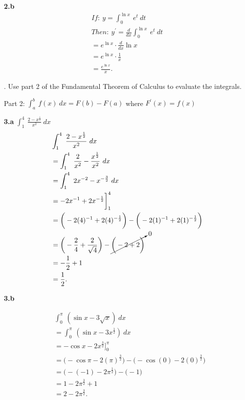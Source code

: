 \documentclass{report}
\begin{document}
    \bigbreak \noindent 
    \textbf{2.b}
    \begin{align*}
        If:\ y = \int_{0}^{\ln{x}}\ e^{t}\ dt \\
        Then:\ y^{\prime} = \frac{d}{dx} \int_{0}^{\ln{x}}\ e^{t}\ dt \\
        = e^{\ln{x}} \cdot \frac{d}{dx}\ln{x} \\
        = e^{\ln{x}} \cdot \frac{1}{x} \\
        = \frac{e^{\ln{x}}}{x}
    .\end{align*}

    \pagebreak \bigbreak {}. Use part 2 of the Fundamental Theorem of Calculus to evaluate the integrals.

    \bigbreak \noindent 
    \begin{remark}
       Part 2: $\int_{a}^{b}\ f(x)\ dx = F(b)-F(a)$ where $F^{\prime}(x) = f(x)$ 
    \end{remark}
    
    \textbf{3.a} $\int_{1}^{4}\ \frac{2-x^{\frac{1}{2}}}{x^{2}} \ dx $
    \begin{align*}
        &\int_{1}^{4}\ \frac{2-x^{\frac{1}{2}}}{x^{2}} \ dx  \\
        &= \int_{1}^{4}\ \frac{2}{x^{2}}-\frac{x^{\frac{1}{2}}}{x^{2}}\ dx \\
        &= \int_{1}^{4}\ 2x^{-2}-x^{-\frac{3}{2}}\ dx \\
        &= -2x^{-1} + 2x^{-\frac{1}{2}} \bigg]^{4}_1 \\
        &= \bigg(-2(4)^{-1}+2(4)^{-\frac{1}{2}}\bigg) - \bigg(-2(1)^{-1}+2(1)^{-\frac{1}{2}}\bigg) \\
        &= \bigg(-\frac{2}{4} + \frac{2}{\sqrt{4}}\bigg) - \cancelto{0}{\bigg(-2 + 2\bigg)} \\
        &= -\frac{1}{2}+1 \\
        &=\frac{1}{2}
    .\end{align*}

    \bigbreak \noindent 
    \textbf{3.b}
    \bigbreak \noindent 
    \begin{minipage}{0.7\textwidth}
    \begin{align*}
        &\int_{0}^{\pi}\ (\sin{x}-3\sqrt{x})\ dx  \\
        &=\int_{0}^{\pi}\ (\sin{x}-3x^{\frac{1}{2}})\ dx \\
        &=-\cos{x}-2x^{\frac{3}{2}}\bigg]^{\pi}_0 \\
        &= \bigg(-\cos{\pi}-2(\pi)^{\frac{3}{2}}\bigg) - \bigg(-\cos{(0)}-2(0)^{\frac{3}{2}}\bigg) \\
        &= \bigg(-(-1)-2\pi^{\frac{1}{2}}\bigg) - \bigg(-1\bigg) \\
        &= 1-2\pi^{\frac{3}{2}} + 1 \\
        &= 2 - 2\pi^{\frac{3}{2}}
    .\end{align*}
    \end{minipage}
\end{document}

